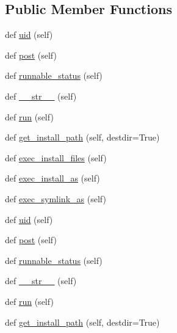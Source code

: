 \subsection*{Public Member Functions}
\begin{DoxyCompactItemize}
\item 
def \hyperlink{classwaflib_1_1_build_1_1inst_af3a833db8b118c295a773017f405de79}{uid} (self)
\item 
def \hyperlink{classwaflib_1_1_build_1_1inst_a747341176f2295022038ca17cf839769}{post} (self)
\item 
def \hyperlink{classwaflib_1_1_build_1_1inst_affb0a840290ad8e000488cc0099950ed}{runnable\+\_\+status} (self)
\item 
def \hyperlink{classwaflib_1_1_build_1_1inst_a32507c568f479fd6409906270834783e}{\+\_\+\+\_\+str\+\_\+\+\_\+} (self)
\item 
def \hyperlink{classwaflib_1_1_build_1_1inst_a0d03fc4440c06aff0a927181771439be}{run} (self)
\item 
def \hyperlink{classwaflib_1_1_build_1_1inst_ac41fdf31d2133d81d941b1bd68ed31f6}{get\+\_\+install\+\_\+path} (self, destdir=True)
\item 
def \hyperlink{classwaflib_1_1_build_1_1inst_abf856d52d82ec26f4cc6f76a7c01ac8b}{exec\+\_\+install\+\_\+files} (self)
\item 
def \hyperlink{classwaflib_1_1_build_1_1inst_a0c951c9f7df7638fd030f2b4e1822a62}{exec\+\_\+install\+\_\+as} (self)
\item 
def \hyperlink{classwaflib_1_1_build_1_1inst_adf421fc92d636c0b2380b8fcd1a54de6}{exec\+\_\+symlink\+\_\+as} (self)
\item 
def \hyperlink{classwaflib_1_1_build_1_1inst_af3a833db8b118c295a773017f405de79}{uid} (self)
\item 
def \hyperlink{classwaflib_1_1_build_1_1inst_a747341176f2295022038ca17cf839769}{post} (self)
\item 
def \hyperlink{classwaflib_1_1_build_1_1inst_affb0a840290ad8e000488cc0099950ed}{runnable\+\_\+status} (self)
\item 
def \hyperlink{classwaflib_1_1_build_1_1inst_a32507c568f479fd6409906270834783e}{\+\_\+\+\_\+str\+\_\+\+\_\+} (self)
\item 
def \hyperlink{classwaflib_1_1_build_1_1inst_a0d03fc4440c06aff0a927181771439be}{run} (self)
\item 
def \hyperlink{classwaflib_1_1_build_1_1inst_ac41fdf31d2133d81d941b1bd68ed31f6}{get\+\_\+install\+\_\+path} (self, destdir=True)
\item 

\end{DoxyCompactItemize}
